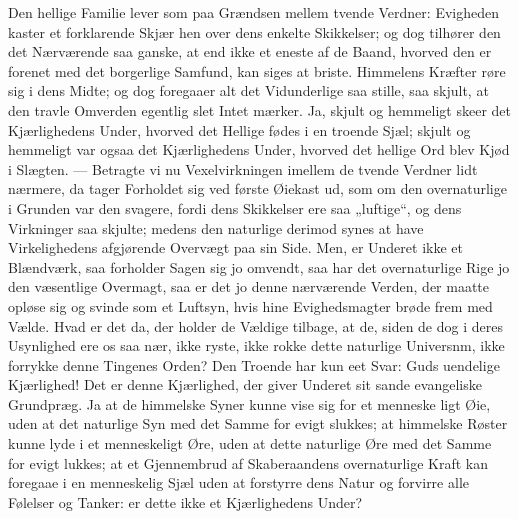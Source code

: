 \documentclass[12pt,a4paper]{book}
\begin{document}
Den hellige Familie lever som paa Grændsen mellem tvende Verdner: Evigheden
kaster et forklarende Skjær hen over dens enkelte Skikkelser; og dog tilhører
den det Nærværende saa ganske, at end ikke et eneste af de Baand, hvorved den er
forenet med det borgerlige Samfund, kan siges at briste. Himmelens Kræfter røre
sig i dens Midte; og dog foregaaer alt det Vidunderlige saa stille, saa skjult,
at den travle Omverden egentlig slet Intet mærker. Ja, skjult og hemmeligt skeer
det Kjærlighedens Under, hvorved det Hellige fødes i en troende Sjæl; skjult og
hemmeligt var ogsaa det Kjærlighedens Under, hvorved det hellige Ord blev Kjød i
Slægten. --- Betragte vi nu
Vexelvirkningen imellem de tvende Verdner lidt nærmere, da tager Forholdet sig
ved første Øiekast ud, som om den overnaturlige i Grunden var den svagere, fordi
dens Skikkelser ere saa „luftige“, og dens Virkninger saa skjulte; medens den
naturlige derimod synes at have Virkelighedens afgjørende Overvægt paa sin Side.
Men, er Underet ikke et Blændværk, saa forholder Sagen sig jo omvendt, saa har
det overnaturlige Rige jo den væsentlige Overmagt, saa er det jo denne
nærværende Verden, der maatte opløse sig og svinde som et Luftsyn, hvis hine
Evighedsmagter brøde frem med Vælde. Hvad er det da, der holder de Vældige
tilbage, at de, siden de dog i deres Usynlighed ere os saa nær, ikke ryste, ikke
rokke dette naturlige
Universnm, ikke forrykke denne Tingenes Orden? Den Troende har kun eet Svar:
Guds uendelige Kjærlighed! Det er denne Kjærlighed, der giver Underet sit sande
evangeliske Grundpræg. Ja at de himmelske Syner kunne vise sig for et
menneske\-%
ligt Øie, uden at det naturlige Syn med det Samme for evigt slukkes; at
himmelske Røster kunne lyde i et menneskeligt Øre, uden at dette naturlige Øre
med det Samme for evigt lukkes; at et Gjennembrud af Skaberaandens
overnaturlige Kraft kan foregaae i en menneskelig Sjæl uden at forstyrre dens
Natur og forvirre alle Følelser og Tanker: er dette ikke et Kjærlighedens Under?
\end{document}
